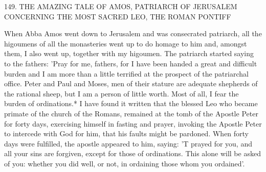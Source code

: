 149.
THE AMAZING TALE OF AMOS,
PATRIARCH OF JERUSALEM
CONCERNING THE MOST SACRED LEO,
THE ROMAN PONTIFF

When Abba Amos went down to Jerusalem and was consecrated
patriarch, all the higoumens of all the monasteries went up to do
homage to him and, amongst them, I also went up, together with
my higoumen.
The patriarch started saying to the fathers: 'Pray for
me, fathers, for I have been handed a great and difficult burden and
I am more than a little terrified at the prospect of the patriarchal
office.
Peter and Paul and Moses, men of their stature are adequate
shepherds of the rational sheep, but I am a person of little worth.
Most of all, I fear the burden of ordinations.* I have found it
written that the blessed Leo who became primate of the church of
the Romans, remained at the tomb of the Apostle Peter for forty
days, exercising himself in fasting and prayer, invoking the Apostle
Peter to intercede with God for him, that his faults might be
pardoned.
When forty days were fulfilled, the apostle appeared to
him, saying: 'T prayed for you, and all your sins are forgiven, except
for those of ordinations.
This alone will be asked of you: whether
you did well, or not, in ordaining those whom you ordained'.

